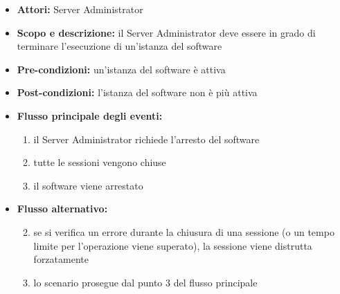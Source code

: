 
\begin{itemize}
	\item \textbf{Attori:} Server Administrator
	\item \textbf{Scopo e descrizione:} il Server Administrator deve essere in grado di terminare l'esecuzione di un'istanza del software
	\item \textbf{Pre-condizioni:} un'istanza del software è attiva
	\item \textbf{Post-condizioni:} l'istanza del software non è più attiva
	\item \textbf{Flusso principale degli eventi:}
		\begin{enumerate}
			\item il Server Administrator richiede l'arresto del software
			\item tutte le sessioni vengono chiuse
			\item il software viene arrestato
		\end{enumerate}
	\item \textbf{Flusso alternativo:}
		\begin{enumerate}
			\setcounter{enumi}{1}
			\item se si verifica un errore durante la chiusura di una sessione (o un tempo limite per l'operazione viene superato), la sessione viene distrutta forzatamente
			\item lo scenario prosegue dal punto 3 del flusso principale
		\end{enumerate}
\end{itemize}
